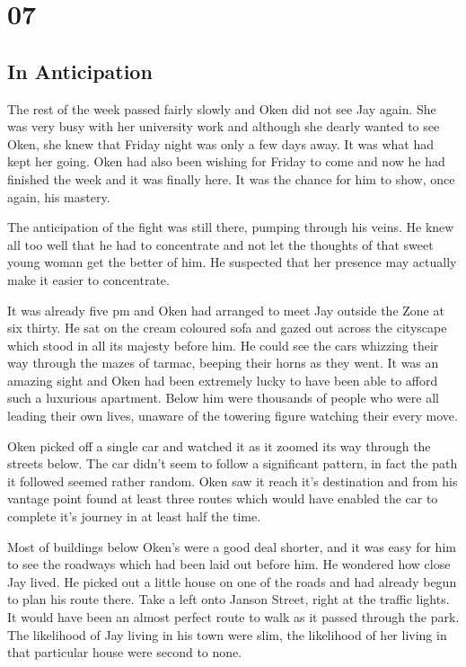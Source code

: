 \chapter{07}
\section{In Anticipation}


The rest of the week passed fairly slowly and Oken did not see Jay again.  She was very busy with her university work and although she dearly wanted to see Oken, she knew that Friday night was only a few days away.  It was what had kept her going.  Oken had also been wishing for Friday to come and now he had finished the week and it was finally here.  It was the chance for him to show, once again, his mastery.

The anticipation of the fight was still there, pumping through his veins.  He knew all too well that he had to concentrate and not let the thoughts of that sweet young woman get the better of him.  He suspected that her presence may actually make it easier to concentrate.  

It was already five pm and Oken had arranged to meet Jay outside the Zone at six thirty.  He sat on the cream coloured sofa and gazed out across the cityscape which stood in all its majesty before him.  He could see the cars whizzing their way through the mazes of tarmac, beeping their horns as they went.  It was an amazing sight and Oken had been extremely lucky to have been able to afford such a luxurious apartment.  Below him were thousands of people who were all leading their own lives, unaware of the towering figure watching their every move.  

Oken picked off a single car and watched it as it zoomed its way through the streets below.  The car didn't seem to follow a significant pattern, in fact the path it followed seemed rather random.  Oken saw it reach it's destination and from his vantage point found at least three routes which would have enabled the car to complete it's journey in at least half the time.

Most of buildings below Oken's were a good deal shorter, and it was easy for him to see the roadways which had been laid out before him.  He wondered how close Jay lived.  He picked out a little house on one of the roads and had already begun to plan his route there.  Take a left onto Janson Street, right at the traffic lights.  It would have been an almost perfect route to walk as it passed through the park.  The likelihood of Jay living in his town were slim, the likelihood of her living in that particular house were second to none.

